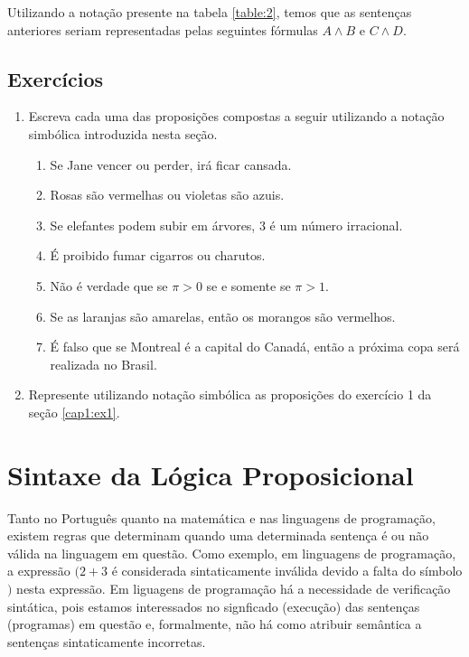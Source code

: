 Utilizando a nota\c{c}\~ao presente na tabela \ref{table:2}, temos que as senten\c{c}as anteriores seriam representadas pelas seguintes f\'ormulas
$A \land B$  e $C \land D$.

\subsection{Exerc\'icios}

\begin{enumerate}
  \item Escreva cada uma das proposi\c{c}\~oes compostas a seguir utilizando a nota\c{c}\~ao simb\'olica introduzida nesta se\c{c}\~ao.
  \begin{enumerate}
    \item Se Jane vencer ou perder, ir\'a ficar cansada.
    \item Rosas s\~ao vermelhas ou violetas s\~ao azuis.
    \item Se elefantes podem subir em \'arvores, 3 \'e um n\'umero irracional.
    \item \'E proibido fumar cigarros ou charutos.
    \item N\~ao \'e verdade que se $\pi > 0$ se e somente se $\pi > 1$.
    \item Se as laranjas s\~ao amarelas, ent\~ao os morangos s\~ao vermelhos.
    \item \'E falso que se Montreal \'e a capital do Canad\'a, ent\~ao a pr\'oxima copa ser\'a realizada no Brasil.
  \end{enumerate}
  \item Represente utilizando nota\c{c}\~ao simb\'olica as proposi\c{c}\~oes do exerc\'icio 1 da se\c{c}\~ao \ref{cap1:ex1}.
\end{enumerate}

\section{Sintaxe da L\'ogica Proposicional}

Tanto no Portugu\^es quanto na matem\'atica e nas linguagens de programa\c{c}\~ao, existem regras que determinam quando uma determinada 
senten\c{c}a \'e ou n\~ao v\'alida na linguagem em quest\~ao. Como exemplo, em linguagens de programa\c{c}\~ao, a express\~ao $(2 + 3$ \'e
considerada sintaticamente inv\'alida devido a falta do s\'imbolo $)$ nesta express\~ao. Em liguagens de programa\c{c}\~ao h\'a a necessidade
de verifica\c{c}\~ao sint\'atica, pois estamos interessados no signficado (execu\c{c}\~ao) das senten\c{c}as (programas) em quest\~ao e, 
formalmente, n\~ao h\'a como atribuir sem\^antica a senten\c{c}as sintaticamente incorretas.

